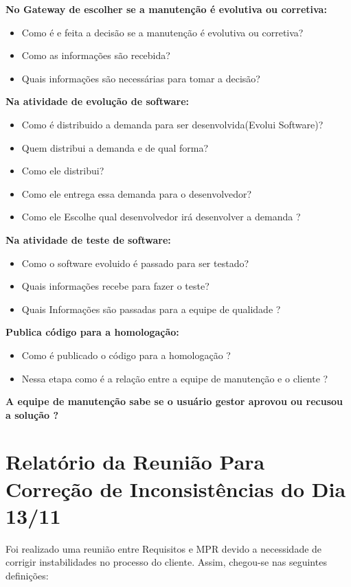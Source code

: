 \textbf{No Gateway de escolher se a manutenção é evolutiva ou corretiva:}
\begin{itemize}
	\item Como é e feita a decisão se a manutenção é evolutiva ou corretiva? 
	\item Como as informações são recebida? 
	\item Quais informações são necessárias para tomar a decisão?
\end{itemize}

\textbf{Na atividade de evolução de software:}
\begin{itemize}
	\item Como é distribuido a demanda para ser desenvolvida(Evolui Software)?  
	\item Quem distribui a demanda e de qual forma?
	\item Como ele distribui?
	\item Como ele entrega essa demanda para o desenvolvedor?
	\item Como ele Escolhe qual desenvolvedor irá desenvolver a demanda ? 
\end{itemize}

\textbf{Na atividade de teste de software:}
\begin{itemize}
	\item Como o software evoluido é passado para ser testado?  
	\item Quais informações recebe para fazer o teste? 
	\item Quais Informações são passadas para a equipe de qualidade ?
\end{itemize}

\textbf{Publica código para a homologação:}
\begin{itemize}
	\item Como é publicado o código para a homologação ?
	\item Nessa etapa como é a relação entre a equipe de manutenção e o cliente ? 
\end{itemize}

\textbf{A equipe de manutenção sabe se o usuário gestor aprovou ou recusou a solução ?}

\section{Relatório da Reunião Para Correção de Inconsistências do Dia 13/11}

Foi realizado uma reunião entre Requisitos e MPR devido a necessidade de corrigir instabilidades no processo do cliente. Assim, chegou-se nas seguintes definições:

